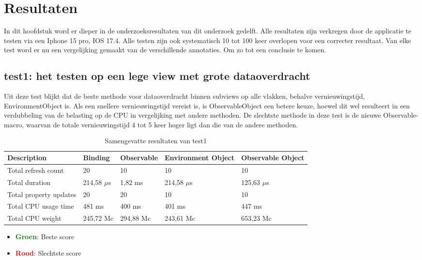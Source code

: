 \chapter{Resultaten}%
\label{ch:resultaten}
In dit hoofdstuk word er dieper in de onderzoeksresultaten van dit onderzoek gedelft. Alle resultaten zijn verkregen door de applicatie te testen via een Iphone 15 pro, IOS 17.4. Alle testen zijn ook systematisch 10 tot 100 keer overlopen voor een correcter resultaat. Van elke test word er nu een vergelijking gemaakt van de verschillende annotaties. Om zo tot een conclusie te komen.

\section{test1: het testen op een lege view met grote dataoverdracht}
Uit deze test blijkt dat de beste methode voor dataoverdracht binnen subviews op alle vlakken, behalve vernieuwingstijd, EnvironmentObject is. Als een snellere vernieuwingstijd vereist is, is ObservableObject een betere keuze, hoewel dit wel resulteert in een verdubbeling van de belasting op de CPU in vergelijking met andere methoden. De slechtste methode in deze test is de nieuwe Observable-macro, waarvan de totale vernieuwingstijd 4 tot 5 keer hoger ligt dan die van de andere methoden. 
\begin{table}[H]
    \centering
    
    \begin{tabularx}{\textwidth}{|>{\raggedright\arraybackslash}m{5cm}|X|X|X|X|}
        \hline
        \textbf{Description} & \textbf{Binding} & \textbf{Observable} & \textbf{Environment Object} & \textbf{Observable Object} \\ 
        \hline
        Total refresh count & \cellcolor{red!50}20 & \cellcolor{green!50}10 & \cellcolor{green!50}10 & \cellcolor{green!50}10 \\ 
        \hline
        Total duration & 214,58 \(\mu\)s & \cellcolor{red!50}1,82 ms & 214,58 \(\mu\)s & \cellcolor{green!50}125,63 \(\mu\)s \\ 
        \hline
        Total property updates & \cellcolor{red!50}20 & \cellcolor{red!50}20 & \cellcolor{green!50}10 & \cellcolor{green!50}10 \\ 
        \hline
        Total CPU usage time & \cellcolor{red!50}481 ms & \cellcolor{green!50}400 ms & \cellcolor{green!50}401 ms & 447 ms \\ 
        \hline
        Total CPU weight & \cellcolor{green!50}245,72 Mc & 294,88 Mc & \cellcolor{green!50}243,61 Mc & \cellcolor{red!50}653,23 Mc \\ 
        \hline
    \end{tabularx}
    \caption{Samengevatte resultaten van test1}
    \label{table:summary1}
\end{table}
\begin{itemize}
    \item \textcolor{green}{\textbf{Groen}}: Beste score
    \item \textcolor{red}{\textbf{Rood}}: Slechtste score
\end{itemize}

